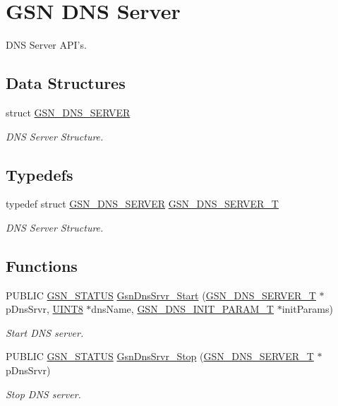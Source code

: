 \hypertarget{a00662}{
\section{GSN DNS Server}
\label{a00662}
}


DNS Server API's.  


\subsection*{Data Structures}
\begin{DoxyCompactItemize}
\item 
struct \hyperlink{a00055}{GSN\_\-DNS\_\-SERVER}
\begin{DoxyCompactList}\small\item\em DNS Server Structure. \end{DoxyCompactList}\end{DoxyCompactItemize}
\subsection*{Typedefs}
\begin{DoxyCompactItemize}
\item 
typedef struct \hyperlink{a00055}{GSN\_\-DNS\_\-SERVER} \hyperlink{a00662_ga85fc2373f7b6a2cfb0ebbbddb036c503}{GSN\_\-DNS\_\-SERVER\_\-T}
\begin{DoxyCompactList}\small\item\em DNS Server Structure. \end{DoxyCompactList}\end{DoxyCompactItemize}
\subsection*{Functions}
\begin{DoxyCompactItemize}
\item 
PUBLIC \hyperlink{a00660_gada5951904ac6110b1fa95e51a9ddc217}{GSN\_\-STATUS} \hyperlink{a00662_gab5a185ee52c26ad8cc547eff1f40bd9c}{GsnDnsSrvr\_\-Start} (\hyperlink{a00055}{GSN\_\-DNS\_\-SERVER\_\-T} $\ast$pDnsSrvr, \hyperlink{a00660_gab27e9918b538ce9d8ca692479b375b6a}{UINT8} $\ast$dnsName, \hyperlink{a00054}{GSN\_\-DNS\_\-INIT\_\-PARAM\_\-T} $\ast$initParams)
\begin{DoxyCompactList}\small\item\em Start DNS server. \end{DoxyCompactList}\item 
PUBLIC \hyperlink{a00660_gada5951904ac6110b1fa95e51a9ddc217}{GSN\_\-STATUS} \hyperlink{a00662_ga61e9319652de6fc7065c3779896c4188}{GsnDnsSrvr\_\-Stop} (\hyperlink{a00055}{GSN\_\-DNS\_\-SERVER\_\-T} $\ast$pDnsSrvr)
\begin{DoxyCompactList}\small\item\em Stop DNS server. \end{DoxyCompactList}\end{DoxyCompactItemize}


